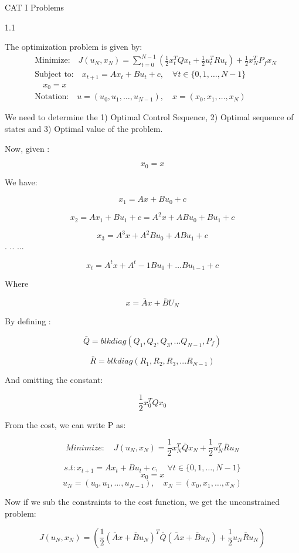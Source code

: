 \documentclass{article}
\begin{document}
CAT I Problems

1.1

The optimization problem is given by:
\begin{align*}
& \text{Minimize:} \quad J(u_N, x_N) = \sum_{t=0}^{N-1} \left(\frac{1}{2} x_t^T Q x_t + \frac{1}{2} u_t^T R u_t\right) + \frac{1}{2} x_N^T P_f x_N \\
& \text{Subject to:} \quad x_{t+1} = A x_t + B u_t + c, \quad \forall t \in \{0, 1, \ldots, N-1\} \\
& \quad x_0 = x \\
& \text{Notation:} \quad u = (u_0, u_1, \ldots, u_{N-1}), \quad x = (x_0, x_1, \ldots, x_N)
\end{align*}


We need to determine the 1) Optimal Control Sequence, 2) Optimal sequence of states and 3) Optimal value of the problem.

Now, given : 

\[ x_0 = x\]

We have:

\[x_1 = Ax + Bu_0 + c\]

\[x_2 = { A}{x_1} + {B}{u_1} + c = A^2x + ABu_0 + Bu_1 + c\]

\[x_3 = A^3x + A^2Bu_0 + ABu_1 + c\]
.
..
...

\[x_t = A^t x + A^t-1Bu_0 + ... Bu_{t-1} + c\]


Where 

\[ x = \bar{A} x + \bar{B}{U_N}\]

By defining :

\[ \bar{Q} = blkdiag(Q_1, Q_2, Q_3, ... Q_{N-1}, P_f) \] 

\[ \bar{R} = blkdiag(R_1, R_2, R_3, ... R_{N-1}) \] 

And omitting the constant:

\[ \frac{1}{2} x_0^T Q x_0\]

From the cost, we can write P as:

\[ {Minimize:} \quad J(u_N, x_N) = \frac{1}{2} x_N^T \bar{Q} x_N + \frac{1}{2} u_N^T \bar{R} u_N \]

\[ s.t : x_{t+1} = A x_t + B u_t + c, \quad \forall t \in \{0, 1, \ldots, N-1\} \] 
\[ x_0 = x \] 
\[ u_N = (u_0, u_1, \ldots, u_{N-1}), \quad x_N = (x_0, x_1, \ldots, x_N) \] 

Now if we sub the constraints to the cost function, we get the unconstrained problem:

\[J(u_N, x_N) = \left(\frac{1}{2} (\bar{A}x + \bar{B}u_N)^T \bar{Q} (\bar{A}x + \bar{B}u_N) + \frac{1}{2} u_N \bar{R} u_N\right) \]
\end{document}
